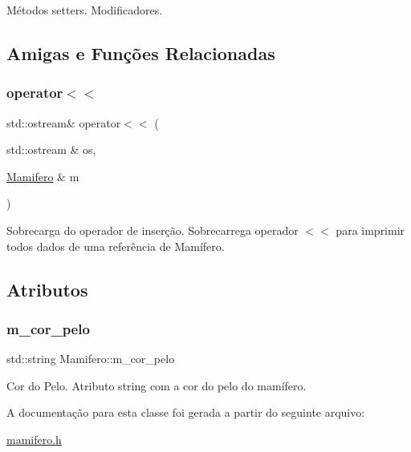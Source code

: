 Métodos setters. Modificadores. 

\subsection{Amigas e Funções Relacionadas}
\mbox{\label{classMamifero_a0640dfc54a3f3ac27ceacc52a23739e3}} 
\subsubsection{\texorpdfstring{operator$<$$<$}{operator<<}}
{\footnotesize\ttfamily std\+::ostream\& operator$<$$<$ (\begin{DoxyParamCaption}\item[{std\+::ostream \&}]{os,  }\item[{\hyperlink{classMamifero}{Mamifero} \&}]{m }\end{DoxyParamCaption})\hspace{0.3cm}{\ttfamily [friend]}}

Sobrecarga do operador de inserção. Sobrecarrega operador $<$$<$ para imprimir todos dados de uma referência de Mamífero. 

\subsection{Atributos}
\mbox{\label{classMamifero_a5a7737addd9b2a5736c2fe8edaba1220}} 
\subsubsection{\texorpdfstring{m\+\_\+cor\+\_\+pelo}{m\_cor\_pelo}}
{\footnotesize\ttfamily std\+::string Mamifero\+::m\+\_\+cor\+\_\+pelo\hspace{0.3cm}{\ttfamily [protected]}}

Cor do Pelo. Atributo string com a cor do pelo do mamífero. 

A documentação para esta classe foi gerada a partir do seguinte arquivo\+:\begin{DoxyCompactItemize}
\item 
\hyperlink{mamifero_8h}{mamifero.\+h}\end{DoxyCompactItemize}
